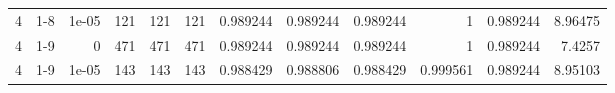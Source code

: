 \begin{tabular}{rlrrrrrrrrrr}
     4 & 1-8    &      1e-05 &         121 &               121 &               121 &     0.989244    &     0.989244    &      0.989244    &        1         &               0.989244 &            8.96475 \\
     4 & 1-9    &      0     &         471 &               471 &               471 &     0.989244    &     0.989244    &      0.989244    &        1         &               0.989244 &            7.4257  \\
     4 & 1-9    &      1e-05 &         143 &               143 &               143 &     0.988429    &     0.988806    &      0.988429    &        0.999561  &               0.989244 &            8.95103 \\
\hline
\end{tabular}
